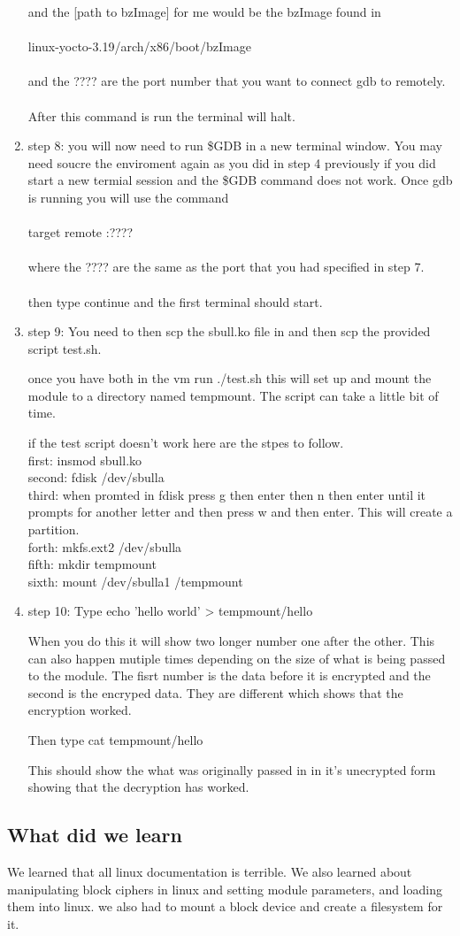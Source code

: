 \documentclass[letterpaper,10pt,titlepage]{article}
\begin{document}
\begin{enumerate}
   and the [path to bzImage] for me would be the bzImage found in\\\\
   linux-yocto-3.19/arch/x86/boot/bzImage\\\\
   and the ???? are the port number that you want to connect gdb to remotely.\\\\
   After this command is run the terminal will halt.
\item{step 8: }
   you will now need to run \$GDB in a new terminal window. You may need soucre 
   the enviroment again as you did in step 4 previously if you did start a new 
   termial session and the \$GDB command does not work. Once gdb is running you 
   will use the command\\\\
   target remote :????\\\\
   where the ???? are the same as the port that you had specified in step 7.\\\\
   then type continue and the first terminal should start.
\item{step 9:}
   You need to then scp the sbull.ko file in and then scp the provided script test.sh.

   once you have both in the vm run ./test.sh this will set up and mount the module to
   a directory named tempmount. The script can take a little bit of time.

   if the test script doesn't work here are the stpes to follow.\\

   first: insmod sbull.ko\\
   second: fdisk /dev/sbulla\\
   third: when promted in fdisk press g then enter then n then enter until it prompts 
   for another letter and then press w and then enter. This will create a partition.\\
   forth: mkfs.ext2 /dev/sbulla\\
   fifth: mkdir tempmount\\
   sixth: mount /dev/sbulla1 /tempmount\\
\item{step 10:}
   Type echo 'hello world' > tempmount/hello
   
   When you do this it will show two longer number one after the other. This can also 
   happen mutiple times depending on the size of what is being passed to the module.
   The fisrt number is the data before it is encrypted and the second is the encryped 
   data. They are different which shows that the encryption worked. 
   
   Then type cat tempmount/hello

   This should show the what was originally passed in in it's unecrypted form 
   showing that the decryption has worked. 
   
   
\end{enumerate}
\subsection{What did we learn}
We learned that all linux documentation is terrible. We also learned about manipulating 
block ciphers in linux and setting module parameters, and loading them into linux. we also had
to mount a block device and create a filesystem for it.
\end{document}
